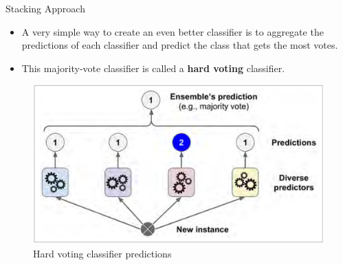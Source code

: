 \documentclass[11pt]{beamer}
\begin{document}
\begin{frame}{Stacking Approach}
	\begin{itemize}
		\item A very simple way to create an even better classifier is to aggregate the predictions of each classifier and predict the class that gets the most votes. 
		\pause
		\item This majority-vote classifier is called a \textbf{hard voting} classifier.
	\end{itemize}
	\begin{figure}
		\centering
		\includegraphics[scale=0.29]{figure7-2}
		\caption{Hard voting classifier predictions}
	\end{figure}		
\end{frame}
\end{document}
